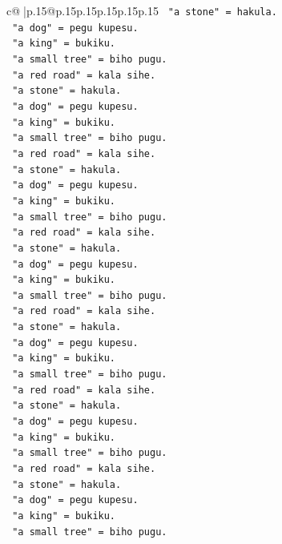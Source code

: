 \documentclass{article}
\begin{document}
{\begin{supertabular}{c@{$\;$}|p{.15\linewidth}@{}p{.15\linewidth}p{.15\linewidth}p{.15\linewidth}p{.15\linewidth}p{.15\linewidth}}
{{{\texttt{   "a stone" = hakula.} \\
\texttt{   "a dog" = pegu kupesu.} \\
\texttt{   "a king" = bukiku.} \\
\texttt{   "a small tree" = biho pugu.} \\
\texttt{   "a red road" = kala sihe.} \\
\texttt{   "a stone" = hakula.} \\
\texttt{   "a dog" = pegu kupesu.} \\
\texttt{   "a king" = bukiku.} \\
\texttt{   "a small tree" = biho pugu.} \\
\texttt{   "a red road" = kala sihe.} \\
\texttt{   "a stone" = hakula.} \\
\texttt{   "a dog" = pegu kupesu.} \\
\texttt{   "a king" = bukiku.} \\
\texttt{   "a small tree" = biho pugu.} \\
\texttt{   "a red road" = kala sihe.} \\
\texttt{   "a stone" = hakula.} \\
\texttt{   "a dog" = pegu kupesu.} \\
\texttt{   "a king" = bukiku.} \\
\texttt{   "a small tree" = biho pugu.} \\
\texttt{   "a red road" = kala sihe.} \\
\texttt{   "a stone" = hakula.} \\
\texttt{   "a dog" = pegu kupesu.} \\
\texttt{   "a king" = bukiku.} \\
\texttt{   "a small tree" = biho pugu.} \\
\texttt{   "a red road" = kala sihe.} \\
\texttt{   "a stone" = hakula.} \\
\texttt{   "a dog" = pegu kupesu.} \\
\texttt{   "a king" = bukiku.} \\
\texttt{   "a small tree" = biho pugu.} \\
\texttt{   "a red road" = kala sihe.} \\
\texttt{   "a stone" = hakula.} \\
\texttt{   "a dog" = pegu kupesu.} \\
\texttt{   "a king" = bukiku.} \\
\texttt{   "a small tree" = biho pugu.} \\
}}}
\end{supertabular}}
\end{document}
